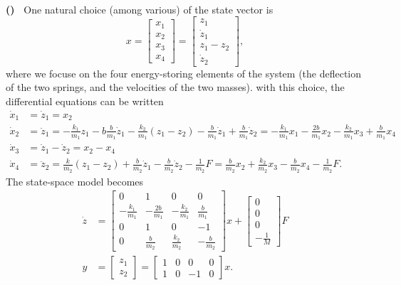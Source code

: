 \documentclass[letterpaper,12pt]{scrartcl}
\newenvironment{exercise}[1][Exercise]{\begin{trivlist} \item[\hskip
    \labelsep {\stepcounter{exerctr}\bfseries #1
      \arabic{exerctr}}]}{\end{trivlist}\vspace{10mm}}
\newcounter{exerctr}
\newcounter{abcctr}[exerctr]
\newcommand{\abc}{\noindent\vspace{1mm}\\ \textbf{
    \stepcounter{abcctr}(\alph{abcctr})\ }}
\newcommand{\bbm}{\begin{bmatrix}}
\newcommand{\ebm}{\end{bmatrix}}
\begin{document}
\begin{exercise}
  \abc
  One natural choice (among various) of the state vector is
  \[ x = \bbm x_1\\ x_2 \\x_3 \\x_4 \ebm = \bbm z_1\\ \dot{z}_1 \\z_1-z_2 \\\dot{z}_2 \ebm, \]
  where we focuse on the four energy-storing elements of the system (the deflection of the two springs, and the velocities of the two masses). with this choice, the differential equations can be written
  \begin{align*}
    \dot{x}_1 &= \dot{z}_1 = x_2\\
    \dot{x}_2 &= \ddot{z}_1 = -\frac{k_1}{m_1} z_1 - b\frac{b}{m_1}\dot{z}_1 - \frac{k_2}{m_1}(z_1-z_2) -\frac{b}{m_1}\dot{z}_1  + \frac{b}{m_1}\dot{z}_2 = -\frac{k_1}{m_1}x_1  - \frac{2b}{m_1}x_2  -\frac{k_2}{m_1}x_3  + \frac{b}{m_1}x_4\\
    \dot{x}_3 &= \dot{z}_1 - \dot{z}_2 = x_2 - x_ 4\\
    \dot{x}_4 &= \ddot{z}_2 = \frac{k}{m_2}(z_1 - z_2) + \frac{b}{m_2}\dot{z}_1 - \frac{b}{m_2}\dot{z}_2 - \frac{1}{m_2}F = \frac{b}{m_2}x_2 + \frac{k_2}{m_2}x_3 - \frac{b}{m_2}x_4 - \frac{1}{m_2}F. 
  \end{align*}
  The state-space model becomes
  \begin{align*}
    \dot{z} &= \bbm 0 & 1 & 0 & 0\\
    -\frac{k_1}{m_1} & -\frac{2b}{m_1} & -\frac{k_2}{m_1} & \frac{b}{m_1} \\
    0 & 1 & 0 & -1\\
    0 & \frac{b}{m_2} & \frac{k_2}{m_2} & -\frac{b}{m_2} \ebm x
                                        + \bbm 0\\0\\0\\-\frac{1}{M}\ebm F\\
    y &= \bbm z_1\\z_2\ebm = \bbm 1 & 0 & 0 & 0\\1 & 0 & -1 & 0\ebm x.
  \end{align*}
\end{exercise}
\end{document}
